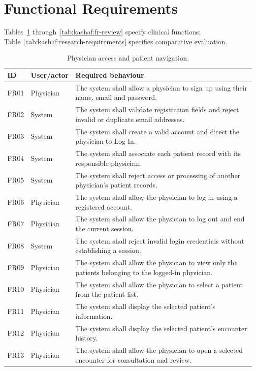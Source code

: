 \section{Functional Requirements}
Tables~\ref{tab:kashaf:fr-access} through~\ref{tab:kashaf:fr-review} specify clinical functions; Table~\ref{tab:kashaf:research-requirements} specifies comparative evaluation.

\begin{table}[htbp]
\centering
\small
\caption{Physician access and patient navigation.}
\label{tab:kashaf:fr-access}
\begin{tabular}{|p{}|p{}|p{}|}
\hline
ID & User/actor & Required behaviour \\ \hline
FR01 & Physician & The system shall allow a physician to sign up using their name, email and password. \\ \hline
FR02 & System & The system shall validate registration fields and reject invalid or duplicate email addresses. \\ \hline
FR03 & System & The system shall create a valid account and direct the physician to Log In. \\ \hline
FR04 & System & The system shall associate each patient record with its responsible physician. \\ \hline
FR05 & System & The system shall reject access or processing of another physician's patient records. \\ \hline
FR06 & Physician & The system shall allow the physician to log in using a registered account. \\ \hline
FR07 & Physician & The system shall allow the physician to log out and end the current session. \\ \hline
FR08 & System & The system shall reject invalid login credentials without establishing a session. \\ \hline
FR09 & Physician & The system shall allow the physician to view only the patients belonging to the logged-in physician. \\ \hline
FR10 & Physician & The system shall allow the physician to select a patient from the patient list. \\ \hline
FR11 & Physician & The system shall display the selected patient's information. \\ \hline
FR12 & Physician & The system shall display the selected patient's encounter history. \\ \hline
FR13 & Physician & The system shall allow the physician to open a selected encounter for consultation and review. \\ \hline
\end{tabular}
\end{table}

